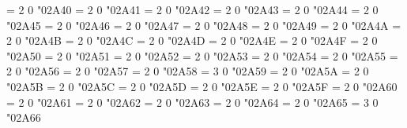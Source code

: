 \Umathchardef\capdot = 2 0 "02A40 %
\Umathchardef\uminus = 2 0 "02A41 %
\Umathchardef\barcup = 2 0 "02A42 %
\Umathchardef\barcap = 2 0 "02A43 %
\Umathchardef\capwedge = 2 0 "02A44 %
\Umathchardef\cupvee = 2 0 "02A45 %
\Umathchardef\cupovercap = 2 0 "02A46 %
\Umathchardef\capovercup = 2 0 "02A47 %
\Umathchardef\cupbarcap = 2 0 "02A48 %
\Umathchardef\capbarcup = 2 0 "02A49 %
\Umathchardef\twocups = 2 0 "02A4A %
\Umathchardef\twocaps = 2 0 "02A4B %
\Umathchardef\closedvarcup = 2 0 "02A4C %
\Umathchardef\closedvarcap = 2 0 "02A4D %
\Umathchardef\Sqcap = 2 0 "02A4E %
\Umathchardef\Sqcup = 2 0 "02A4F %
\Umathchardef\closedvarcupsmashprod = 2 0 "02A50 %
\Umathchardef\wedgeodot = 2 0 "02A51 %
\Umathchardef\veeodot = 2 0 "02A52 %
\Umathchardef\Wedge = 2 0 "02A53 %
\Umathchardef\Vee = 2 0 "02A54 %
\Umathchardef\wedgeonwedge = 2 0 "02A55 %
\Umathchardef\veeonvee = 2 0 "02A56 %
\Umathchardef\bigslopedvee = 2 0 "02A57 %
\Umathchardef\bigslopedwedge = 2 0 "02A58 %
\Umathchardef\veeonwedge = 3 0 "02A59 %
\Umathchardef\wedgemidvert = 2 0 "02A5A %
\Umathchardef\veemidvert = 2 0 "02A5B %
\Umathchardef\midbarwedge = 2 0 "02A5C %
\Umathchardef\midbarvee = 2 0 "02A5D %
\Umathchardef\doublebarwedge = 2 0 "02A5E %
\Umathchardef\wedgebar = 2 0 "02A5F %
\Umathchardef\wedgedoublebar = 2 0 "02A60 %
\Umathchardef\varveebar = 2 0 "02A61 %
\Umathchardef\doublebarvee = 2 0 "02A62 %
\Umathchardef\veedoublebar = 2 0 "02A63 %
\Umathchardef\dsub = 2 0 "02A64 %
\Umathchardef\rsub = 2 0 "02A65 %
\Umathchardef\eqdot = 3 0 "02A66 %
